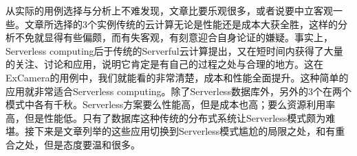 \documentclass[11pt]{article}
\begin{document}
从实际的用例选择与分析上不难发现，文章\cite{jonas2019cloud}比\cite{hellerstein2018serverless}要乐观很多，或者说要中立客观一些。文章\cite{hellerstein2018serverless}所选择的3个实例传统的云计算无论是性能还是成本大获全胜，这样的分析不免就显得有些偏颇，而有失客观，有刻意迎合自身论证的嫌疑。事实上，Serverless computing后于传统的Serverful云计算提出，又在短时间内获得了大量的关注、讨论和应用，说明它肯定是有自己的过程之处与合理的地方。这在ExCamera的用例中，我们就能看的非常清楚，成本和性能全面提升。这种简单的应用就非常适合Serverless computing。除了Serverless数据库外，另外的3个在两个模式中各有千秋。Serverless方案要么性能高，但是成本也高；要么资源利用率高，但是性能低。只有了数据库这种传统的分布式系统让Serverless模式颇为难堪。接下来是文章\cite{jonas2019cloud}列举的这些应用切换到Serverless模式尴尬的局限之处，和\cite{hellerstein2018serverless}有重合之处，但是态度要温和很多。
\end{document}

